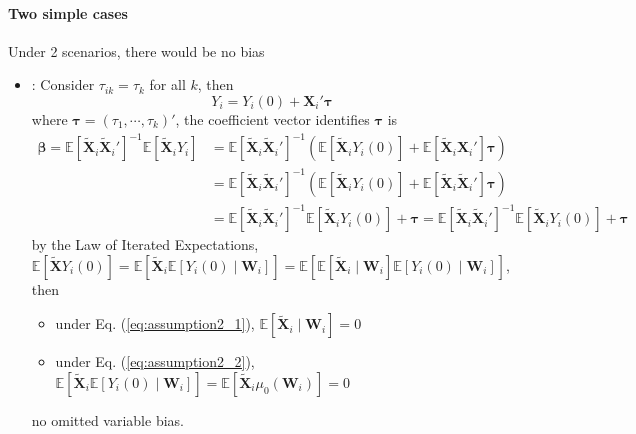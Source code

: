 \documentclass[twoside]{article}
\begin{document}
\paragraph*{Two simple cases}
Under 2 scenarios, there would be no bias 
\begin{itemize}
    \item {}:
    Consider $\tau_{ik}=\tau_k$ for all $k$, then $$Y_i = Y_i(0)+ \mathbf{X}_i'\boldsymbol{\tau}$$ where $\boldsymbol{\tau} = \left(\tau_1,\cdots,\tau_k\right)'$, the coefficient vector identifies $\boldsymbol{\tau}$ is 
    \begin{align*}
        \boldsymbol{\beta} = \mathbb{E}\left[\tilde{\mathbf{X}}_i\tilde{\mathbf{X}}_i'\right]^{-1}\mathbb{E}\left[\tilde{\mathbf{X}}_iY_i\right] &= \mathbb{E}\left[\tilde{\mathbf{X}}_i\tilde{\mathbf{X}}_i'\right]^{-1}\left(\mathbb{E}\left[\tilde{\mathbf{X}}_iY_i(0)\right] + \mathbb{E}\left[\tilde{\mathbf{X}}_i{\mathbf{X}}_i'\right]\boldsymbol{\tau}\right)\\
        &= \mathbb{E}\left[\tilde{\mathbf{X}}_i\tilde{\mathbf{X}}_i'\right]^{-1}\left(\mathbb{E}\left[\tilde{\mathbf{X}}_iY_i(0)\right] + \mathbb{E}\left[\tilde{\mathbf{X}}_i\tilde{\mathbf{X}}_i'\right]\boldsymbol{\tau}\right)\\
        &= \mathbb{E}\left[\tilde{\mathbf{X}}_i\tilde{\mathbf{X}}_i'\right]^{-1} \mathbb{E}\left[\tilde{\mathbf{X}}_iY_i(0)\right] + \boldsymbol{\tau} = \mathbb{E}\left[\tilde{\mathbf{X}}_i\tilde{\mathbf{X}}_i'\right]^{-1} \mathbb{E}\left[\tilde{\mathbf{X}}_iY_i(0)\right] + \boldsymbol{\tau}
    \end{align*}
    by the Law of Iterated Expectations, $\mathbb{E}\left[\tilde{\mathbf{X}}Y_i(0)\right] = \mathbb{E}\left[\tilde{\mathbf{X}}_i \mathbb{E}\left[Y_i(0)\mid \mathbf{W}_i\right]\right] = \mathbb{E}\left[\mathbb{E}\left[\tilde{\mathbf{X}}_i\mid \mathbf{W}_i\right] \mathbb{E}\left[Y_i(0)\mid \mathbf{W}_i\right]\right]$, then 
    \begin{itemize}
        \item under Eq. (\ref{eq:assumption2_1}), $\mathbb{E}\left[\tilde{\mathbf{X}}_i \mid \mathbf{W}_i\right] = 0$
        \item under Eq. (\ref{eq:assumption2_2}), $\mathbb{E}\left[\tilde{\mathbf{X}}_i \mathbb{E}\left[Y_i(0)\mid \mathbf{W}_i\right] \right] = \mathbb{E}\left[ \tilde{\mathbf{X}}_i\mu_0(\mathbf{W}_i) \right] =0$
    \end{itemize}
    no omitted variable bias.

\end{itemize}
\end{document}

